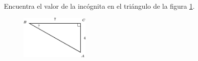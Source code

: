 Encuentra el valor de la incógnita en el triángulo de la figura \ref{fig:angle_functrig_23}.
\begin{figure}[H]
    \begin{center}
        \includegraphics[width=0.3\textwidth]{../images/angle_functrig_23.png}
    \end{center}
    \caption{}
    \label{fig:angle_functrig_23}
\end{figure}